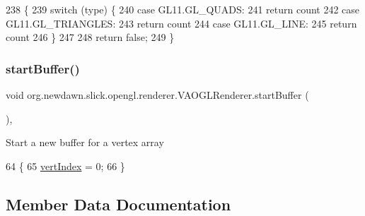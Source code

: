 \begin{DoxyCode}
238                                                       \{
239         \textcolor{keywordflow}{switch} (type) \{
240         \textcolor{keywordflow}{case} GL11.GL\_QUADS:
241             \textcolor{keywordflow}{return} count %
242         \textcolor{keywordflow}{case} GL11.GL\_TRIANGLES:
243             \textcolor{keywordflow}{return} count %
244         \textcolor{keywordflow}{case} GL11.GL\_LINE:
245             \textcolor{keywordflow}{return} count %
246         \}
247         
248         \textcolor{keywordflow}{return} \textcolor{keyword}{false};
249     \}
\end{DoxyCode}
\mbox{\label{classorg_1_1newdawn_1_1slick_1_1opengl_1_1renderer_1_1_v_a_o_g_l_renderer_aec6f5ba886a3a750c3cc27527e7b6b6e}} 
\subsubsection{\texorpdfstring{start\+Buffer()}{startBuffer()}}
{\footnotesize\ttfamily void org.\+newdawn.\+slick.\+opengl.\+renderer.\+V\+A\+O\+G\+L\+Renderer.\+start\+Buffer (\begin{DoxyParamCaption}{ }\end{DoxyParamCaption})\hspace{0.3cm}{\ttfamily [inline]}, {\ttfamily [private]}}

Start a new buffer for a vertex array 
\begin{DoxyCode}
64                                \{
65         \mbox{\hyperlink{classorg_1_1newdawn_1_1slick_1_1opengl_1_1renderer_1_1_v_a_o_g_l_renderer_a04b3aeb5aa19f464215aafe532cf4d24}{vertIndex}} = 0;
66     \}
\end{DoxyCode}


\subsection{Member Data Documentation}
\mbox{\label{classorg_1_1newdawn_1_1slick_1_1opengl_1_1renderer_1_1_v_a_o_g_l_renderer_aff2f26ed4c579285e854a123093f3315}} 

